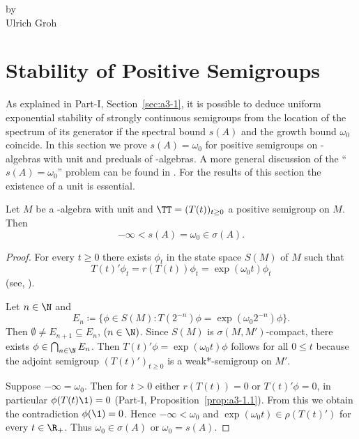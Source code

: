 \setcounter{section}{0}
\label{chap:d4}
\thispagestyle{empty}
{\Large
\vspace*{-.75cm}
by \\[.25em]
Ulrich Groh
\vspace{.75cm}
\\
}
\section{Stability of Positive Semigroups}\label{sec:d4-1}
As explained in Part-I, Section~\ref{sec:a3-1}, it is possible to deduce uniform exponential stability of strongly continuous semigroups from the location of the spectrum of its generator if the spectral bound $ s(A) $ and the growth bound $ \omega_{0} $ coincide.
In this section we prove $s(A) = \omega_{0}$ for positive semigroups on \CA-algebras with unit and preduals of \WA-algebras.
A more general discussion of the \enquote{$s(A) = \omega_{0}$} problem can be found in \textcite{greinervoigtwolff:1981}.
For the results of this section the existence of a unit is essential.
\begin{theorem}\label{thm:d4-1.1}
Let $M$ be a \CA-algebra with unit and $\TT = (T(t))_{t \geq 0}$ a positive semigroup on $M$.
Then
\[
	-\infty < s(A) = \omega_{0} \in \sigma(A).
\]
\end{theorem}
\begin{proof}
For every  $t \geq 0 $ there exists $\phi_{t}$ in the state space $S(M)$ of\/ $M$ such that
\[
	T(t)'\phi_{t} = r(T(t))\phi_{t} = \exp(\omega_{0} t)\phi_{t}
\]
(see, \eg \textcite[2.1]{groh:1981}).

Let $n \in \N$ and
\[
	E_{n} \coloneqq \{\phi \in S(M) \colon T(2^{-n})\phi = \exp(\omega_{0} 2^{-n})\phi \}.
\]
Then $\emptyset \neq E_{n+1} \subseteq E_{n}$,  $(n \in \N)$.
Since $S(M)$ is $\sigma(M,M')$-compact, there exists $\phi \in \bigcap_{n \in \N} E_{n}$.
Then $ T(t)'\phi = \exp(\omega_{0} t)\phi$ follows for all $ 0 \leq t $ because the adjoint semigroup $(T(t)')_{t \geq 0}$ is a weak*-semigroup on $M'$.

Suppose $-\infty = \omega_{0}$.
Then for $t > 0$ either $r(T(t)) = 0$  or $T(t)'\phi = 0$, in particular $\phi(T(t)\1) = 0$ (Part-I, Proposition~\ref{prop:a3-1.1}).
From this we obtain the contradiction $\phi(\1) = 0$.
Hence $-\infty < \omega_{0}$ and $\exp(\omega_{0} t) \in \rho(T(t)')$ for every $t \in \R_{+}$.
Thus $\omega_{0} \in \sigma(A)$ or $\omega_{0} = s(A)$.
\end{proof}
